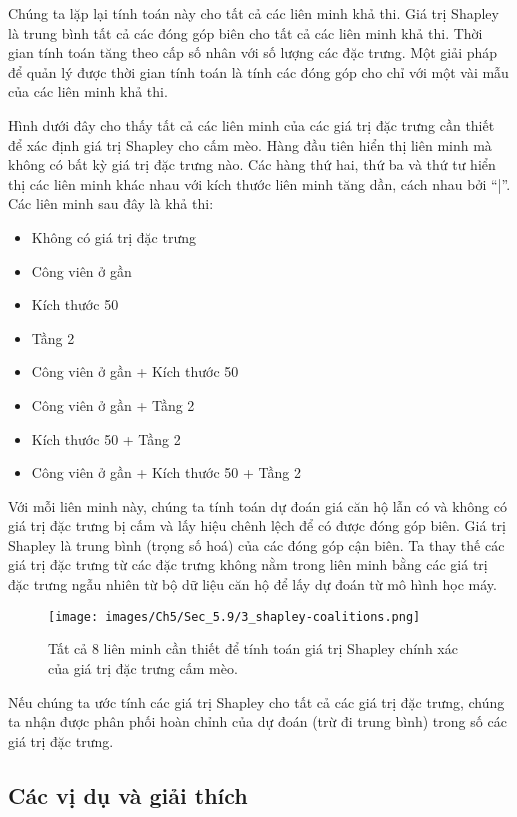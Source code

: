Chúng ta lặp lại tính toán này cho tất cả các liên minh khả thi. Giá trị Shapley là trung bình tất cả các đóng góp biên cho tất cả các liên minh khả thi. Thời gian tính toán tăng theo cấp số nhân với số lượng các đặc trưng. Một giải pháp để quản lý được thời gian tính toán là tính các đóng góp cho chỉ với một vài mẫu của các liên minh khả thi.

Hình dưới đây cho thấy tất cả các liên minh của các giá trị đặc trưng cần thiết để xác định giá trị Shapley cho cấm mèo. Hàng đầu tiên hiển thị liên minh mà không có bất kỳ giá trị đặc trưng nào. Các hàng thứ hai, thứ ba và thứ tư hiển thị các liên minh khác nhau với kích thước liên minh tăng dần, cách nhau bởi ``|''. Các liên minh sau đây là khả thi:

\begin{itemize}
\item Không có giá trị đặc trưng
\item Công viên ở gần
\item  Kích thước 50
\item  Tầng 2
\item  Công viên ở gần + Kích thước 50
\item  Công viên ở gần + Tầng 2
\item  Kích thước 50 + Tầng 2
\item  Công viên ở gần + Kích thước 50 + Tầng 2
\end{itemize}

Với mỗi liên minh này, chúng ta tính toán dự đoán giá căn hộ lẫn có và không có giá trị đặc trưng bị cấm và lấy hiệu chênh lệch để có được đóng góp biên. Giá trị Shapley là trung bình (trọng số hoá) của các đóng góp cận biên. Ta thay thế các giá trị đặc trưng từ các đặc trưng không nằm trong liên minh bằng các giá trị đặc trưng ngẫu nhiên từ bộ dữ liệu căn hộ để lấy dự đoán từ mô hình học máy.


\begin{figure*}[h!]
	\centering
	\texttt{[image: images/Ch5/Sec\_5.9/3\_shapley-coalitions.png]}
	\label{fig:5_45}
	\caption{ Tất cả 8 liên minh cần thiết để tính toán giá trị Shapley chính xác của giá trị đặc trưng cấm mèo.}
\end{figure*}

Nếu chúng ta ước tính các giá trị Shapley cho tất cả các giá trị đặc trưng, chúng ta nhận được phân phối hoàn chỉnh của dự đoán (trừ đi trung bình) trong số các giá trị đặc trưng.

\subsection{ Các vị dụ và giải thích}

